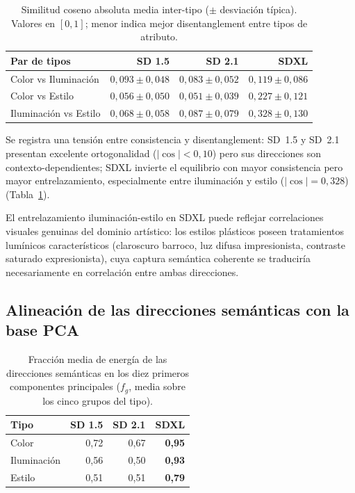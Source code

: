 \documentclass[12pt, a4paper, twoside]{book}
\begin{document}
\begin{table}[htb]
\centering
\caption{Similitud coseno absoluta media inter-tipo ($\pm$ desviación típica).
Valores en $[0, 1]$; menor indica mejor disentanglement entre tipos de atributo.}
\label{tab:ortogonalidad}
\small
\begin{tabular}{lrrr}
\toprule
\textbf{Par de tipos} & \textbf{SD 1.5} & \textbf{SD 2.1} & \textbf{SDXL} \\
\midrule
Color vs Iluminación  & $0{,}093 \pm 0{,}048$ & $0{,}083 \pm 0{,}052$ & $0{,}119 \pm 0{,}086$ \\
Color vs Estilo       & $0{,}056 \pm 0{,}050$ & $0{,}051 \pm 0{,}039$ & $0{,}227 \pm 0{,}121$ \\
Iluminación vs Estilo & $0{,}068 \pm 0{,}058$ & $0{,}087 \pm 0{,}079$ & $0{,}328 \pm 0{,}130$ \\
\bottomrule
\end{tabular}
\end{table}

Se registra una tensión entre consistencia y disentanglement: SD~1.5 y SD~2.1
presentan excelente ortogonalidad ($|\cos| < 0{,}10$) pero sus direcciones son
contexto-dependientes; SDXL invierte el equilibrio con mayor consistencia pero mayor
entrelazamiento, especialmente entre iluminación y estilo ($|\cos| = 0{,}328$)
(Tabla~\ref{tab:ortogonalidad}).

El entrelazamiento iluminación-estilo en SDXL puede reflejar correlaciones visuales genuinas
del dominio artístico: los estilos plásticos poseen tratamientos lumínicos característicos
(claroscuro barroco, luz difusa impresionista, contraste saturado expresionista), cuya
captura semántica coherente se traduciría necesariamente en correlación entre ambas
direcciones.

\subsection{Alineación de las direcciones semánticas con la base PCA}
\label{subsec:res:energia_pca}

\begin{table}[htb]
\centering
\caption{Fracción media de energía de las direcciones semánticas en los diez primeros
componentes principales ($f_g$, media sobre los cinco grupos del tipo).}
\label{tab:energia_pca}
\small
\begin{tabular}{lrrr}
\toprule
\textbf{Tipo} & \textbf{SD 1.5} & \textbf{SD 2.1} & \textbf{SDXL} \\
\midrule
Color       & 0,72 & 0,67 & \textbf{0,95} \\
Iluminación & 0,56 & 0,50 & \textbf{0,93} \\
Estilo      & 0,51 & 0,51 & \textbf{0,79} \\
\bottomrule
\end{tabular}
\end{table}
\end{document}
